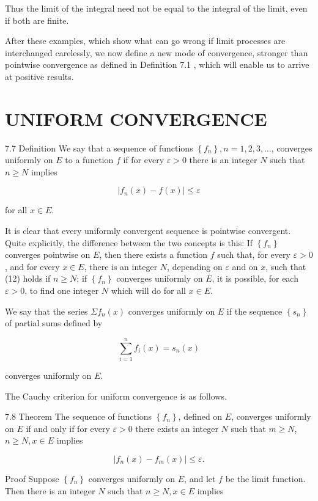 \documentclass[10pt]{article}
\begin{document}
Thus the limit of the integral need not be equal to the integral of the limit, even if both are finite.

After these examples, which show what can go wrong if limit processes are interchanged carelessly, we now define a new mode of convergence, stronger than pointwise convergence as defined in Definition 7.1 , which will enable us to arrive at positive results.

\section{UNIFORM CONVERGENCE}
7.7 Definition We say that a sequence of functions $\left\{f_{n}\right\}, n=1,2,3, \ldots$, converges uniformly on $E$ to a function $f$ if for every $\varepsilon>0$ there is an integer $N$ such that $n \geq N$ implies

$$
\left|f_{n}(x)-f(x)\right| \leq \varepsilon
$$

for all $x \in E$.

It is clear that every uniformly convergent sequence is pointwise convergent. Quite explicitly, the difference between the two concepts is this: If $\left\{f_{n}\right\}$ converges pointwise on $E$, then there exists a function $f$ such that, for every $\varepsilon>0$, and for every $x \in E$, there is an integer $N$, depending on $\varepsilon$ and on $x$, such that (12) holds if $n \geq N$; if $\left\{f_{n}\right\}$ converges uniformly on $E$, it is possible, for each $\varepsilon>0$, to find one integer $N$ which will do for all $x \in E$.

We say that the series $\Sigma f_{n}(x)$ converges uniformly on $E$ if the sequence $\left\{s_{n}\right\}$ of partial sums defined by

$$
\sum_{i=1}^{n} f_{i}(x)=s_{n}(x)
$$

converges uniformly on $E$.

The Cauchy criterion for uniform convergence is as follows.

7.8 Theorem The sequence of functions $\left\{f_{n}\right\}$, defined on $E$, converges uniformly on $E$ if and only if for every $\varepsilon>0$ there exists an integer $N$ such that $m \geq N$, $n \geq N, x \in E$ implies

$$
\left|f_{n}(x)-f_{m}(x)\right| \leq \varepsilon .
$$

Proof Suppose $\left\{f_{n}\right\}$ converges uniformly on $E$, and let $f$ be the limit function. Then there is an integer $N$ such that $n \geq N, x \in E$ implies
\end{document}
